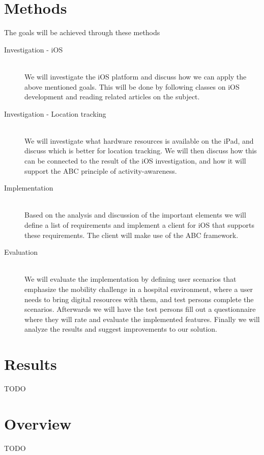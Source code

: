\section{Methods}
The goals will be achieved through these methods

\begin{description}
  \item[Investigation - iOS] \hfill \\
  We will investigate the iOS platform and discuss how we can apply the above mentioned goals. This will be done by following classes on iOS development and reading related articles on the subject.

  \item[Investigation - Location tracking] \hfill \\
We will investigate what hardware resources is available on the iPad, and discuss which is better for location tracking. We will then discuss how this can be connected to the result of the iOS investigation, and how it will support the ABC principle of activity-awareness.

  \item[Implementation] \hfill \\
  Based on the analysis and discussion of the important elements we will define a list of requirements and implement a client for iOS that supports these requirements. The client will make use of the ABC framework.
  
  \item[Evaluation] \hfill \\
We will evaluate the implementation by defining user scenarios that emphasize the mobility challenge in a hospital environment, where a user needs to bring digital resources with them, and test persons complete the scenarios. Afterwards we will have the test persons fill out a questionnaire where they will rate and evaluate the implemented features. Finally we will analyze the results and suggest improvements to our solution.

\end{description}

\section{Results}
TODO

\section{Overview}
TODO